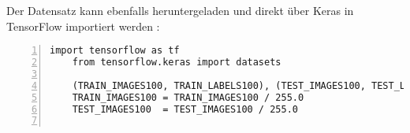Der Datensatz kann ebenfalls heruntergeladen und direkt über Keras in TensorFlow importiert werden \cite{kaggle.21.09.2020}:

\begin{code}
    
\begin{lstlisting}[language=MyPython, numbers=left,label={src:cifarimport}]
    import tensorflow as tf
    from tensorflow.keras import datasets
    
    (TRAIN_IMAGES100, TRAIN_LABELS100), (TEST_IMAGES100, TEST_LABELS100) = tf.keras.datasets.cifar100.load_data()
	TRAIN_IMAGES100 = TRAIN_IMAGES100 / 255.0
    TEST_IMAGES100  = TEST_IMAGES100 / 255.0
    
\end{lstlisting}
  \caption{Laden und Normalisieren des Datensatzes \ac{cifar}-100}
\end{code}

